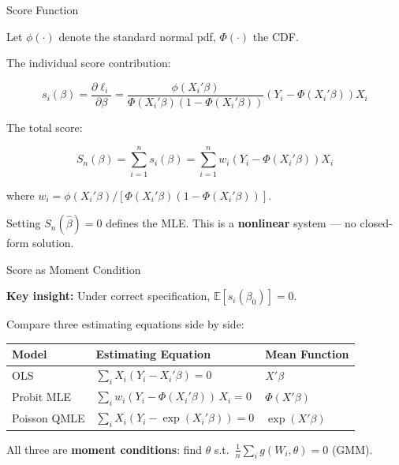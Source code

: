 \documentclass[aspectratio=169]{beamer}
\numberwithin{equation}{section}
\begin{document}

\begin{frame}{Score Function}

Let $\phi(\cdot)$ denote the standard normal pdf, $\Phi(\cdot)$ the CDF.

\pause

The individual score contribution:

\[
s_i(\beta) = \frac{\partial \ell_i}{\partial \beta}
=
\frac{\phi(X_i'\beta)}{\Phi(X_i'\beta)(1-\Phi(X_i'\beta))}
\left(Y_i - \Phi(X_i'\beta)\right) X_i
\]

\pause

The total score:

\[
S_n(\beta) = \sum_{i=1}^n s_i(\beta) = \sum_{i=1}^n w_i \left(Y_i - \Phi(X_i'\beta)\right) X_i
\]

where $w_i = \phi(X_i'\beta)/[\Phi(X_i'\beta)(1-\Phi(X_i'\beta))]$.

\pause

\bigskip

Setting $S_n(\hat\beta) = 0$ defines the MLE. This is a \textbf{nonlinear} system --- no closed-form solution.

\end{frame}


\begin{frame}{Score as Moment Condition}

\textbf{Key insight:} Under correct specification, $\mathbb{E}[s_i(\beta_0)] = 0$.

\pause

\bigskip

Compare three estimating equations side by side:

\medskip

\renewcommand{\arraystretch}{1.8}
\begin{tabular}{lll}
\toprule
\textbf{Model} & \textbf{Estimating Equation} & \textbf{Mean Function} \\
\midrule
OLS & $\displaystyle\sum_i X_i(Y_i - X_i'\beta) = 0$ & $X'\beta$ \\[6pt]
Probit MLE & $\displaystyle\sum_i w_i(Y_i - \Phi(X_i'\beta))\, X_i = 0$ & $\Phi(X'\beta)$ \\[6pt]
Poisson QMLE & $\displaystyle\sum_i X_i(Y_i - \exp(X_i'\beta)) = 0$ & $\exp(X'\beta)$ \\[6pt]
\bottomrule
\end{tabular}
\renewcommand{\arraystretch}{1.0}

\pause

\smallskip

All three are \textbf{moment conditions}: find $\theta$ s.t.\ $\frac{1}{n}\sum_i g(W_i, \theta) = 0$ (GMM).

\end{frame}
\end{document}
